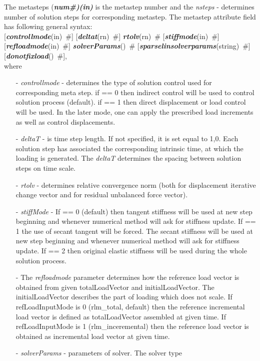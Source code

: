 \documentclass[draft]{article}
\newcommand{\param}[1]{{\em #1}}
\newcommand{\fieldVal}[2]{\mbox{({\it\bf{#1}\#)\tiny (#2)}}}
\newcommand{\keywordnotype}[1]{\mbox{{\it{\bf{#1}}}}}
\newcommand{\keyword}[2]{\mbox{{\keywordnotype{#1}\tiny (#2)}}}
\newcommand{\field}[2]{\mbox{\keyword{#1}{#2}~\#}}
\newcommand{\optField}[2]{\mbox{[\field{#1}{#2}]}}
\begin{document}
The metasteps \fieldVal{num}{in} is the metastep number and the
\param{nsteps} - determines number of solution steps for corresponding
metastep.
The metastep attribute field has following general syntax:\\
\optField{controllmode}{in} \optField{deltat}{rn}
\field{rtolv}{rn} \optField{stiffmode}{in}\\
\optField{refloadmode}{in} \field{solverParams}{}
\optField{sparselinsolverparams}{string} \optField{donotfixload}{},\\
where 
\begin{itemize}
\item[-] \param{controllmode} - determines the type of solution
control used for corresponding meta step. if == 0 then indirect
control will be used to control solution process (default). if == 1
then direct displacement or load control will be used. In the later
mode, one can apply the prescribed load increments as well as
control displacements.
\item[-] \param{deltaT} - is time step length. If not specified, it is
set equal to 1,0. Each solution step has associated the corresponding
intrinsic time, at which the loading is generated. The \param{deltaT}
determines the spacing between solution steps on time scale. 
\item[-] \param{rtolv} - determines relative convergence norm (both for displacement
iterative change vector and for residual unbalanced force vector).
\item[-] \param{stiffMode} - If == 0 (default) then tangent stiffness will be used
at new step beginning and whenever numerical method will ask for
stiffness update. If == 1 the use of secant tangent will be forced. 
The secant stiffness will be used at new step beginning 
and whenever numerical method will ask for stiffness update.
If == 2 then original elastic stiffness will
be used during the whole solution process.
\item[-] The \param{refloadmode} parameter determines how the reference load vector 
is obtained from given totalLoadVector and initialLoadVector.
The initialLoadVector describes the part of loading which does not scale.
If refLoadInputMode is 0 (rlm\_total, default) then the reference incremental load vector is defined as
totalLoadVector assembled at given time.
If refLoadInputMode is 1 (rlm\_inceremental) then the reference load vector is
obtained as incremental load vector at given time.
\item[-] \param{solverParams} - parameters of solver. The solver type

\end{itemize}
\end{document}
